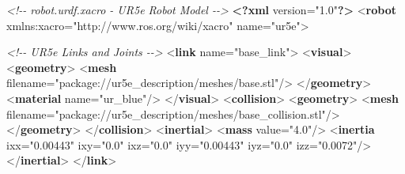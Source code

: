 \documentclass[
]{article}
\newenvironment{Shaded}{\begin{snugshade}}{\end{snugshade}}
\newcommand{\CommentTok}[1]{\textcolor[rgb]{0.56,0.35,0.01}{\textit{#1}}}
\newcommand{\FunctionTok}[1]{\textcolor[rgb]{0.13,0.29,0.53}{\textbf{#1}}}
\newcommand{\KeywordTok}[1]{\textcolor[rgb]{0.13,0.29,0.53}{\textbf{#1}}}
\newcommand{\NormalTok}[1]{#1}
\newcommand{\OtherTok}[1]{\textcolor[rgb]{0.56,0.35,0.01}{#1}}
\newcommand{\StringTok}[1]{\textcolor[rgb]{0.31,0.60,0.02}{#1}}
\begin{document}
\begin{Shaded}
\begin{Highlighting}[]
\CommentTok{\textless{}!{-}{-} robot.urdf.xacro {-} UR5e Robot Model {-}{-}\textgreater{}}
\FunctionTok{\textless{}?xml}\OtherTok{ version=}\StringTok{"1.0"}\FunctionTok{?\textgreater{}}
\NormalTok{\textless{}}\KeywordTok{robot}\OtherTok{ xmlns:xacro=}\StringTok{"http://www.ros.org/wiki/xacro"}\OtherTok{ name=}\StringTok{"ur5e"}\NormalTok{\textgreater{}}

  \CommentTok{\textless{}!{-}{-} UR5e Links and Joints {-}{-}\textgreater{}}
\NormalTok{  \textless{}}\KeywordTok{link}\OtherTok{ name=}\StringTok{"base\_link"}\NormalTok{\textgreater{}}
\NormalTok{    \textless{}}\KeywordTok{visual}\NormalTok{\textgreater{}}
\NormalTok{      \textless{}}\KeywordTok{geometry}\NormalTok{\textgreater{}}
\NormalTok{        \textless{}}\KeywordTok{mesh}\OtherTok{ filename=}\StringTok{"package://ur5e\_description/meshes/base.stl"}\NormalTok{/\textgreater{}}
\NormalTok{      \textless{}/}\KeywordTok{geometry}\NormalTok{\textgreater{}}
\NormalTok{      \textless{}}\KeywordTok{material}\OtherTok{ name=}\StringTok{"ur\_blue"}\NormalTok{/\textgreater{}}
\NormalTok{    \textless{}/}\KeywordTok{visual}\NormalTok{\textgreater{}}
\NormalTok{    \textless{}}\KeywordTok{collision}\NormalTok{\textgreater{}}
\NormalTok{      \textless{}}\KeywordTok{geometry}\NormalTok{\textgreater{}}
\NormalTok{        \textless{}}\KeywordTok{mesh}\OtherTok{ filename=}\StringTok{"package://ur5e\_description/meshes/base\_collision.stl"}\NormalTok{/\textgreater{}}
\NormalTok{      \textless{}/}\KeywordTok{geometry}\NormalTok{\textgreater{}}
\NormalTok{    \textless{}/}\KeywordTok{collision}\NormalTok{\textgreater{}}
\NormalTok{    \textless{}}\KeywordTok{inertial}\NormalTok{\textgreater{}}
\NormalTok{      \textless{}}\KeywordTok{mass}\OtherTok{ value=}\StringTok{"4.0"}\NormalTok{/\textgreater{}}
\NormalTok{      \textless{}}\KeywordTok{inertia}\OtherTok{ ixx=}\StringTok{"0.00443"}\OtherTok{ ixy=}\StringTok{"0.0"}\OtherTok{ ixz=}\StringTok{"0.0"}\OtherTok{ iyy=}\StringTok{"0.00443"}\OtherTok{ iyz=}\StringTok{"0.0"}\OtherTok{ izz=}\StringTok{"0.0072"}\NormalTok{/\textgreater{}}
\NormalTok{    \textless{}/}\KeywordTok{inertial}\NormalTok{\textgreater{}}
\NormalTok{  \textless{}/}\KeywordTok{link}\NormalTok{\textgreater{}}


\end{Highlighting}
\end{Shaded}
\end{document}
